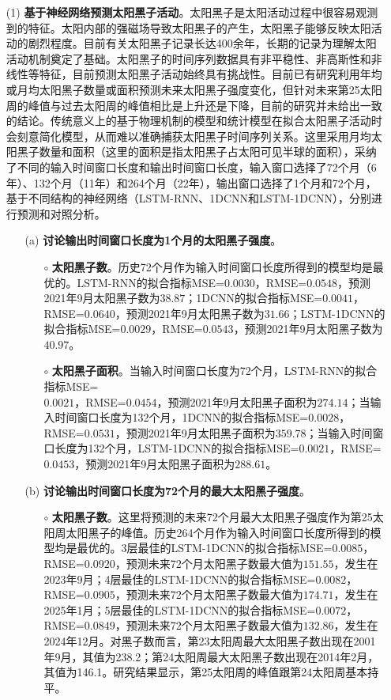 \begin{enumerate}
  \item[(1)] \textbf{基于神经网络预测太阳黑子活动}。太阳黑子是太阳活动过程中很容易观测到的特征。太阳内部的强磁场导致太阳黑子的产生，太阳黑子能够反映太阳活动的剧烈程度。目前有关太阳黑子记录长达400余年，长期的记录为理解太阳活动机制奠定了基础。太阳黑子的时间序列数据具有非平稳性、非高斯性和非线性等特征，目前预测太阳黑子活动始终具有挑战性。目前已有研究利用年均或月均太阳黑子数量或面积预测未来太阳黑子强度变化，但针对未来第25太阳周的峰值与过去太阳周的峰值相比是上升还是下降，目前的研究并未给出一致的结论。传统意义上的基于物理机制的模型和统计模型在拟合太阳黑子活动时会刻意简化模型，从而难以准确捕获太阳黑子时间序列关系。这里采用月均太阳黑子数量和面积（这里的面积是指太阳黑子占太阳可见半球的面积），采纳了不同的输入时间窗口长度和输出时间窗口长度，输入窗口选择了72个月（6年）、132个月（11年）和264个月（22年），输出窗口选择了1个月和72个月，基于不同结构的神经网络（LSTM-RNN、1DCNN和LSTM-1DCNN），分别进行预测和对照分析。
  \begin{itemize}
    \item[(a)] \textbf{讨论输出时间窗口长度为1个月的太阳黑子强度}。
    \begin{itemize}
      \item[$\circ$] \textbf{太阳黑子数}。历史72个月作为输入时间窗口长度所得到的模型均是最优的。LSTM-RNN的拟合指标MSE=$0.0030$，RMSE=$0.0548$，预测2021年9月太阳黑子数为$38.87$；1DCNN的拟合指标MSE=$0.0041$，RMSE=$0.0640$，预测2021年9月太阳黑子数为$31.66$；LSTM-1DCNN的拟合指标MSE=$0.0029$，RMSE=$0.0543$，预测2021年9月太阳黑子数为$40.97$。
      \item[$\circ$] \textbf{太阳黑子面积}。当输入时间窗口长度为72个月，LSTM-RNN的拟合指标MSE=\\$0.0021$，RMSE=$0.0454$，预测2021年9月太阳黑子面积为$274.14$；当输入时间窗口长度为132个月，1DCNN的拟合指标MSE=$0.0028$，RMSE=$0.0531$，预测2021年9月太阳黑子面积为$359.78$；当输入时间窗口长度为132个月，LSTM-1DCNN的拟合指标MSE=$0.0021$，RMSE=$0.0453$，预测2021年9月太阳黑子面积为$288.61$。
    \end{itemize}
    \item[(b)] \textbf{讨论输出时间窗口长度为72个月的最大太阳黑子强度}。
    \begin{itemize}
      \item[$\circ$] \textbf{太阳黑子数}。这里将预测的未来72个月最大太阳黑子强度作为第25太阳周太阳黑子的峰值。历史264个月作为输入时间窗口长度所得到的模型均是最优的。3层最佳的LSTM-1DCNN的拟合指标MSE=$0.0085$，RMSE=$0.0920$，预测未来72个月太阳黑子数最大值为$151.55$，发生在2023年9月；4层最佳的LSTM-1DCNN的拟合指标MSE=$0.0082$，RMSE=$0.0905$，预测未来72个月太阳黑子数最大值为$174.71$，发生在2025年1月；5层最佳的LSTM-1DCNN的拟合指标MSE=$0.0072$，RMSE=$0.0849$，预测未来72个月太阳黑子数最大值为$132.86$，发生在2024年12月。对黑子数而言，第23太阳周最大太阳黑子数出现在2001年9月，其值为238.2；第24太阳周最大太阳黑子数出现在2014年2月，其值为146.1。研究结果显示，第25太阳周的峰值跟第24太阳周基本持平。 

\end{itemize}
\end{itemize}
\end{enumerate}
